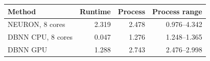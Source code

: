 \begin{tabular}{lrrr}
\toprule
Method & Runtime & Process & Process range\\
\midrule
NEURON, 8 cores & 2.319 & 2.478 & 0.976--4.342 \\
DBNN CPU, 8 cores & 0.047 & 1.276 & 1.248--1.365 \\
DBNN GPU & 1.288 & 2.743 & 2.476--2.998 \\
\bottomrule
\end{tabular}
